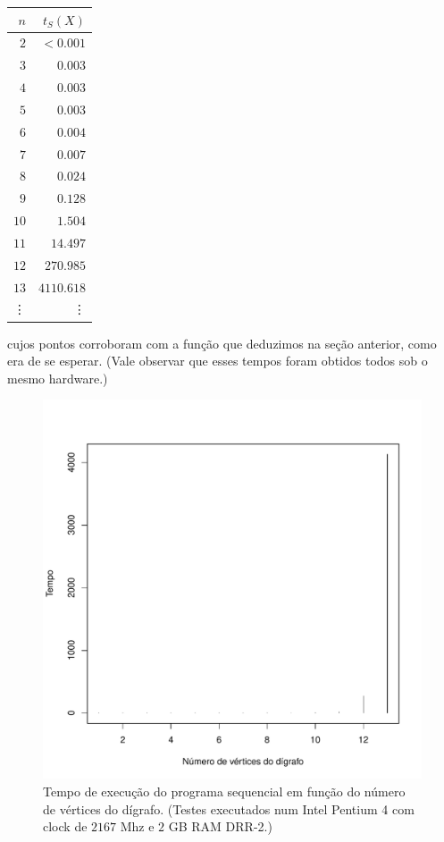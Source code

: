 \documentclass[a4paper,article,10pt]{article}
\begin{document}
    \begin{center}
      \begin{tabular}{|r|r|}
        \hline 
        $n$ & $t_S(X)$ \\
        \hline
        $2$ & $<0.001$ \\
        $3$ & $0.003$ \\
        $4$ & $0.003$ \\
        $5$ & $0.003$ \\
        $6$ & $0.004$ \\
        $7$ & $0.007$ \\
        $8$ & $0.024$ \\
        $9$ & $0.128$ \\
        $10$ & $1.504$ \\
        $11$ & $14.497$ \\
        $12$ & $270.985$ \\
        $13$ & $4110.618$ \\
        \vdots & \vdots \\
        \hline
      \end{tabular}
    \end{center}

    cujos pontos corroboram com a função que deduzimos na seção anterior, como
    era de se esperar.
    (Vale observar que esses tempos foram obtidos todos sob o mesmo hardware.)

    \begin{figure}
      \centering
      \includegraphics[scale=0.75]{sequencial.pdf}
      \caption{Tempo de execução do programa sequencial em função do número de
        vértices do dígrafo. (Testes executados num Intel Pentium 4 com clock de
        $2167$ Mhz e $2$ GB RAM DRR-2.)}
      \label{fig-sequencial}
    \end{figure}
    
\end{document}
